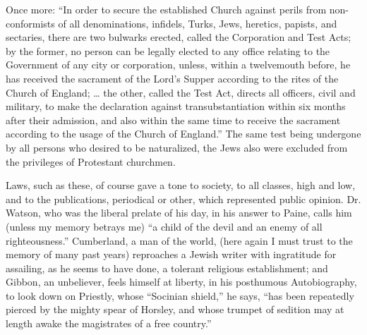 Once more: ``In order to secure the established Church against
perils from non-conformists of all denominations, infidels, Turks, Jews,
heretics, papists, and sectaries, there are two bulwarks erected, called
the Corporation and Test Acts; by the former, no person can be legally
elected to any office relating to the Government of any city or
corporation, unless, within a twelvemouth before, he has received
the sacrament of the Lord's Supper according to the rites of the Church
of England; … the other, called the Test Act, directs all officers,
civil and military, to make the declaration against transubstantiation
within six months after their admission, and also within the same time
to receive the sacrament according to the usage of the Church of
England.'' The same test being undergone by all persons who desired
to be naturalized, the Jews also were excluded from the privileges of
Protestant churchmen.

Laws, such as these, of course gave a tone to society, to all
classes, high and low, and to the publications, periodical or other,
which represented public opinion. Dr. Watson, who was the liberal
prelate of his day, in his answer to Paine, calls him (unless my memory
betrays me) ``a child of the devil and an enemy of all
righteousness.'' Cumberland, a man of the world, (here again I must
trust to the memory of many past years) reproaches a Jewish writer with
ingratitude for assailing, as he seems to have done, a tolerant
religious establishment; and Gibbon, an unbeliever, feels himself at
liberty, in his posthumous Autobiography, to look down on Priestly,
whose ``Socinian shield,'' he says, ``has been repeatedly
pierced by the mighty spear of Horsley, and whose trumpet of sedition
may at length awake the magistrates of a free country.''

